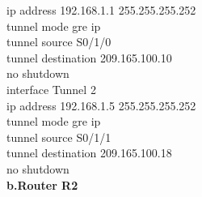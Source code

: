 \documentclass[12pt,a4paper]{report}
\begin{document}
{\hspace*{2cm}ip address 192.168.1.1 255.255.255.252\\
\hspace*{2cm}tunnel mode gre ip\\
\hspace*{2cm}tunnel source S0/1/0\\
\hspace*{2cm}tunnel destination 209.165.100.10\\
\hspace*{2cm}no shutdown\\
\hspace*{2cm}interface Tunnel 2\\
\hspace*{2cm}ip address 192.168.1.5 255.255.255.252\\
\hspace*{2cm}tunnel mode gre ip\\
\hspace*{2cm}tunnel source S0/1/1\\
\hspace*{2cm}tunnel destination 209.165.100.18\\
\hspace*{2cm}no shutdown\\}
\hspace*{1cm}\textbf{b.Router R2} \\
\end{document}
